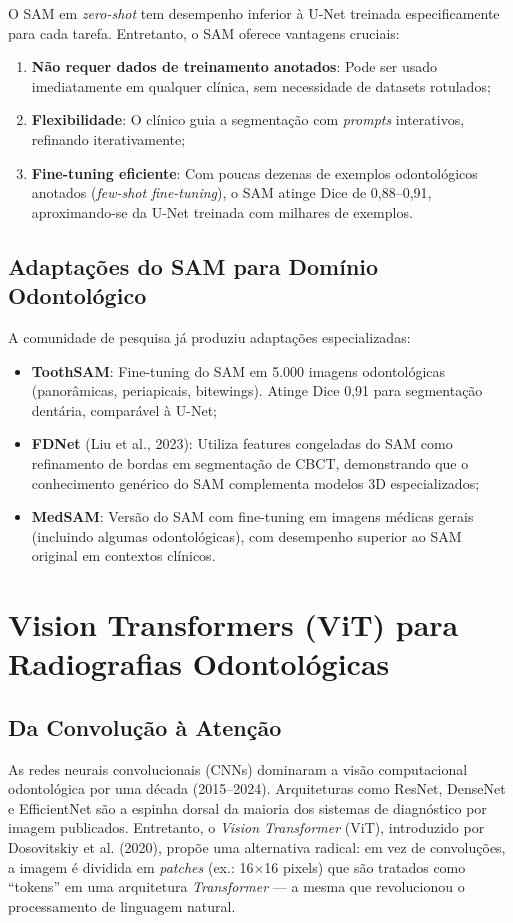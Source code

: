O SAM em \textit{zero-shot} tem desempenho inferior à U-Net treinada especificamente para cada tarefa. Entretanto, o SAM oferece vantagens cruciais:
\begin{enumerate}
    \item \textbf{Não requer dados de treinamento anotados}: Pode ser usado imediatamente em qualquer clínica, sem necessidade de datasets rotulados;
    \item \textbf{Flexibilidade}: O clínico guia a segmentação com \textit{prompts} interativos, refinando iterativamente;
    \item \textbf{Fine-tuning eficiente}: Com poucas dezenas de exemplos odontológicos anotados (\textit{few-shot fine-tuning}), o SAM atinge Dice de 0,88--0,91, aproximando-se da U-Net treinada com milhares de exemplos.
\end{enumerate}

\subsection{Adaptações do SAM para Domínio Odontológico}

A comunidade de pesquisa já produziu adaptações especializadas:
\begin{itemize}
    \item \textbf{ToothSAM}: Fine-tuning do SAM em 5.000 imagens odontológicas (panorâmicas, periapicais, bitewings). Atinge Dice 0,91 para segmentação dentária, comparável à U-Net;
    \item \textbf{FDNet} (Liu et al., 2023): Utiliza features congeladas do SAM como refinamento de bordas em segmentação de CBCT, demonstrando que o conhecimento genérico do SAM complementa modelos 3D especializados;
    \item \textbf{MedSAM}: Versão do SAM com fine-tuning em imagens médicas gerais (incluindo algumas odontológicas), com desempenho superior ao SAM original em contextos clínicos.
\end{itemize}

\section{Vision Transformers (ViT) para Radiografias Odontológicas}

\subsection{Da Convolução à Atenção}

As redes neurais convolucionais (CNNs) dominaram a visão computacional odontológica por uma década (2015--2024). Arquiteturas como ResNet, DenseNet e EfficientNet são a espinha dorsal da maioria dos sistemas de diagnóstico por imagem publicados. Entretanto, o \textit{Vision Transformer} (ViT), introduzido por Dosovitskiy et al. (2020), propõe uma alternativa radical: em vez de convoluções, a imagem é dividida em \textit{patches} (ex.: 16$\times$16 pixels) que são tratados como ``tokens'' em uma arquitetura \textit{Transformer} --- a mesma que revolucionou o processamento de linguagem natural.


